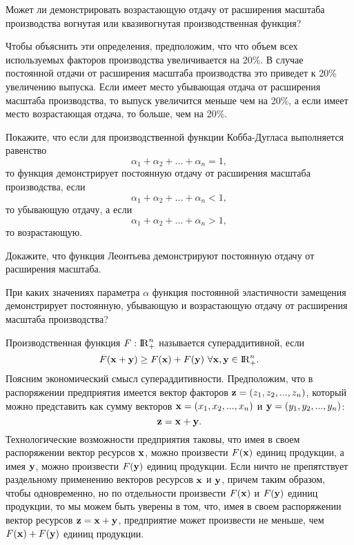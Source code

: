 \begin{exer}
    Может ли демонстрировать возрастающую отдачу от расширения
    масштаба производства вогнутая или квазивогнутая
    производственная функция?

\end{exer}

        Чтобы объяснить эти определения, предположим, что что объем всех
        используемых факторов производства увеличивается
        на 20\%. В случае постоянной отдачи от расширения масштаба
        производства это приведет к 20\% увеличению выпуска. Если имеет
        место убывающая отдача от расширения масштаба производства,
        то выпуск увеличится меньше чем на 20\%, а если имеет место
        возрастающая отдача, то больше, чем на 20\%.


\begin{exer}
    Покажите, что если для производственной функции Кобба-Дугласа
    выполняется равенство
     \[\alpha_{1}+\alpha_{2}+...+\alpha_{n}=1,\]
    то функция демонстрирует постоянную отдачу от расширения масштаба
    производства, если
     \[\alpha_{1}+\alpha_{2}+...+\alpha_{n}<1,\]
    то убывающую отдачу, а если
     \[\alpha_{1}+\alpha_{2}+...+\alpha_{n}>1,\]
    то возрастающую.
\end{exer}

\begin{exer}
    Докажите, что  функция
    Леонтьева демонстрируют постоянную отдачу от расширения масштаба.
\end{exer}

\begin{exer}
    При каких значениях параметра $\alpha$  функция постоянной
    эластичности замещения демонстрирует постоянную, убывающую
    и возрастающую отдачу от расширения масштаба производства?
\end{exer}








    Производственная функция $F:{\rm I\!R}_{+}^{n}$ называется супераддитивной, если
    \[F(\mathbf{x}+\mathbf{y})\geq F(\mathbf{x})+F(\mathbf{y}) \ \forall  \mathbf{x},\mathbf{y} \in{\rm I\!R}_{+}^{n}.\]
    Поясним экономический смысл супераддитивности. Предположим, что
     в распоряжении предприятия имеется вектор факторов $\mathbf{z}=(z_{1},z_{2},...,z_{n})$,
      который можно представить как сумму векторов $\mathbf{x}=(x_{1},x_{2},...,x_{n})$
      и $\mathbf{y}=(y_{1},y_{2},...,y_{n})$:
    \[\mathbf{z}=\mathbf{x}+\mathbf{y}.\]
    Технологические возможности предприятия таковы, что имея в своем
    распоряжении вектор ресурсов $\mathbf{x}$, можно произвести $F(\mathbf{x})$ единиц
    продукции, а имея $\mathbf{y}$, можно произвести $F(\mathbf{y})$ единиц продукции.
    Если ничто не препятствует раздельному применению векторов ресурсов
    $\mathbf{x}$ и $\mathbf{y}$, причем таким образом, чтобы одновременно, но по отдельности произвести
    $F(\mathbf{x})$ и $F(\mathbf{y})$ единиц продукции, то мы можем быть уверены в том,
    что, имея в своем распоряжении вектор ресурсов $\mathbf{z}=\mathbf{x}+\mathbf{y}$,
    предприятие может произвести не меньше, чем $F(\mathbf{x})+F(\mathbf{y})$
    единиц продукции.

